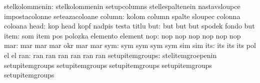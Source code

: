                   stelkolommenin: stelkolommenin                   setupcolumns
                                  stellespaltenein                 nastavsloupce
                                  impostacolonne                   seteazacoloane
                          column: kolom                            column
                                  spalte                           sloupec
                                  colonna                          coloana
                            head: kop                              head
                                  kopf                             nadpis
                                  testa                            titlu %
                             but: but                              but
                                  but                              spodek
                                  fondo                            but
                            item: som                              item
                                  pos                              polozka
                                  elemento                         element
                             nop: nop                              nop
                                  nop                              nop
                                  nop                              nop
                             mar: mar                              mar
                                  mar                              okr
                                  mar                              mar
                             sym: sym                              sym
                                  sym                              sym
                                  sim                              sim
                             its: its                              its
                                  its                              pol %
                                  el                               el  %
                             ran: ran                              ran
                                  ran                              ran
                                  ran                              ran
                 setupitemgroups: stelitemgroepenin                setupitemgroups
                                  setupitemgroups                  setupitemgroups
                                  setupitemgroups                  setupitemgroups


